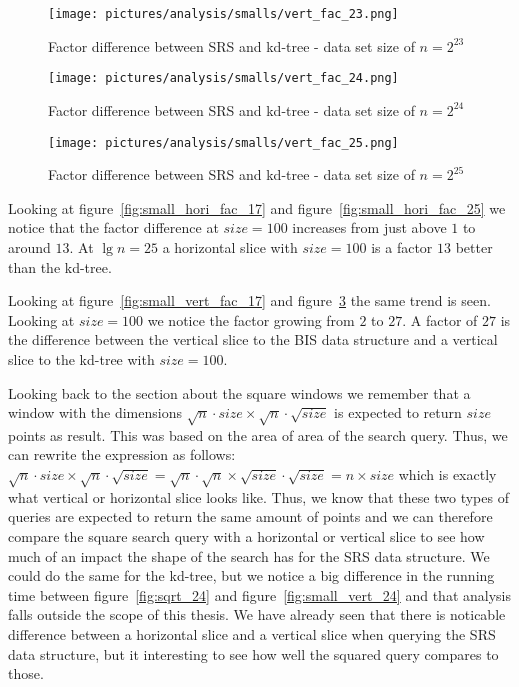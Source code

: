 \begin{figure}[h]
    \centering
    \texttt{[image: pictures/analysis/smalls/vert\_fac\_23.png]}
    \caption{Factor difference between SRS and kd-tree - data set size of $n=2^{23}$}\label{fig:small_vert_fac_23}
\end{figure}

\begin{figure}[h]
    \centering
    \texttt{[image: pictures/analysis/smalls/vert\_fac\_24.png]}
    \caption{Factor difference between SRS and kd-tree - data set size of $n=2^{24}$}\label{fig:small_vert_fac_24}
\end{figure}

\begin{figure}[h]
    \centering
    \texttt{[image: pictures/analysis/smalls/vert\_fac\_25.png]}
    \caption{Factor difference between SRS and kd-tree - data set size of $n=2^{25}$}\label{fig:small_vert_fac_25}
\end{figure}
\clearpage

Looking at figure~\ref{fig:small_hori_fac_17} and figure~\ref{fig:small_hori_fac_25} we notice that the factor difference at $size=100$ increases from just above $1$ to around $13$. At $\lg n = 25$ a horizontal slice with $size = 100$ is a factor $13$ better than the kd-tree. 

Looking at figure~\ref{fig:small_vert_fac_17} and figure~\ref{fig:small_vert_fac_25} the same trend is seen. Looking at $size = 100$ we notice the factor growing from $2$ to $27$. A factor of $27$ is the difference between the vertical slice to the BIS data structure and a vertical slice to the kd-tree with $size = 100$.

Looking back to the section about the square windows we remember that a window with the dimensions $\sqrt{n}\cdot{size} \times \sqrt{n}\cdot\sqrt{size}$ is expected to return $size$ points as result. This was based on the area of area of the search query. Thus, we can rewrite the expression as follows: $\sqrt{n}\cdot{size} \times \sqrt{n}\cdot\sqrt{size} = \sqrt{n}\cdot\sqrt{n} \times \sqrt{size}\cdot\sqrt{size} = n \times size$ which is exactly what vertical or horizontal slice looks like. Thus, we know that these two types of queries are expected to return the same amount of points and we can therefore compare the square search query with a horizontal or vertical slice to see how much of an impact the shape of the search has for the SRS data structure. We could do the same for the kd-tree, but we notice a big difference in the running time between figure~\ref{fig:sqrt_24} and figure~\ref{fig:small_vert_24} and that analysis falls outside the scope of this thesis. We have already seen that there is noticable difference between a horizontal slice and a vertical slice when querying the SRS data structure, but it interesting to see how well the squared query compares to those. 


